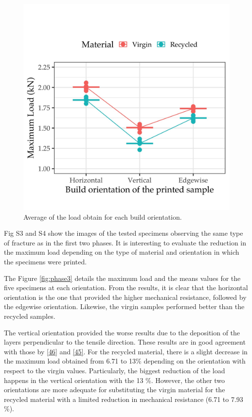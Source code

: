 \documentclass[conference,final,]{IEEEtran}
\begin{document}
\begin{figure}

{\centering \includegraphics[width=\linewidth]{Figures/Phase-3} 

}

\caption{Average of the load obtain for each build orientation. \label{fig:phase3}}\label{fig:Fig.Phase.3}
\end{figure}

Fig S3 and S4 show the images of the tested specimens observing the same
type of fracture as in the first two phases. It is interesting to
evaluate the reduction in the maximum load depending on the type of
material and orientation in which the specimens were printed.

The Figure \ref{fig:phase3} details the maximum load and the means
values for the five specimens at each orientation. From the results, it
is clear that the horizontal orientation is the one that provided the
higher mechanical resistance, followed by the edgewise orientation.
Likewise, the virgin samples performed better than the recycled samples.

The vertical orientation provided the worse results due to the
deposition of the layers perpendicular to the tensile direction. These
results are in good agreement with those by
\protect\hyperlink{ref-Corapi2019}{{[}46{]}} and
\protect\hyperlink{ref-Wang2020h}{{[}45{]}}. For the recycled material,
there is a slight decrease in the maximum load obtained from 6.71 to
13\% depending on the orientation with respect to the virgin values.
Particularly, the biggest reduction of the load happens in the vertical
orientation with the 13 \%. However, the other two orientations are more
adequate for substituting the virgin material for the recycled material
with a limited reduction in mechanical resistance (6.71 to 7.93 \%).
\end{document}
